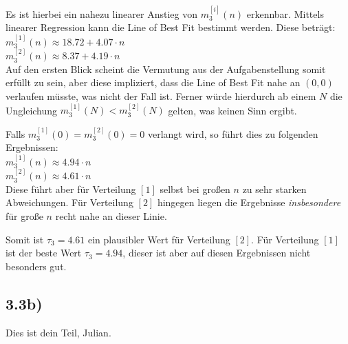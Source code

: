 \documentclass[maincolor=black]{exercise}
\begin{document}
Es ist hierbei ein nahezu linearer Anstieg von $m_3^{[i]}(n)$ erkennbar. Mittels linearer Regression kann die Line of Best Fit bestimmt werden. Diese beträgt:\\
$m_3^{[1]}(n) \approx 18.72+4.07\cdot n$\\
$m_3^{[2]}(n) \approx 8.37+4.19\cdot n$\\
Auf den ersten Blick scheint die Vermutung aus der Aufgabenstellung somit erfüllt zu sein, aber diese impliziert, dass die Line of Best Fit nahe an $(0,0)$ verlaufen müsste, was nicht der Fall ist. Ferner würde hierdurch ab einem $N$ die Ungleichung $m_3^{[1]}(N) < m_3^{[2]}(N)$ gelten, was keinen Sinn ergibt.\par
Falls $m_3^{[1]}(0) = m_3^{[2]}(0) = 0$ verlangt wird, so führt dies zu folgenden Ergebnissen:\\
$m_3^{[1]}(n) \approx 4.94\cdot n$\\
$m_3^{[2]}(n) \approx 4.61\cdot n$\\
Diese führt aber für Verteilung $[1]$ selbst bei großen $n$ zu sehr starken Abweichungen. Für Verteilung $[2]$ hingegen liegen die Ergebnisse \emph{insbesondere} für große $n$ recht nahe an dieser Linie.\par
Somit ist $\tau_3 = 4.61$ ein plausibler Wert für Verteilung $[2]$. Für Verteilung $[1]$ ist der beste Wert $\tau_3 = 4.94$, dieser ist aber auf diesen Ergebnissen nicht besonders gut.

\subsection{3.3b)}
Dies ist dein Teil, Julian.
\end{document}
